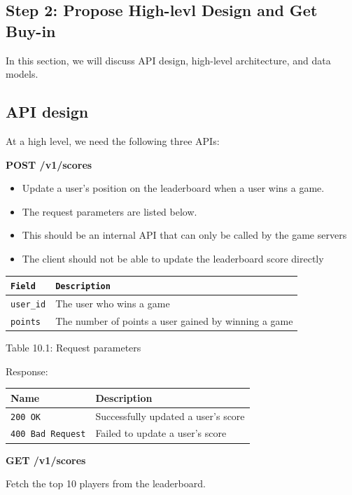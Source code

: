 \documentclass{report}
\theoremstyle{definition}
\let\oldsubsection\subsection
\renewcommand{\subsection}{\oldsubsection*}
\begin{document}
\subsection{Step 2: Propose High-levl Design and Get Buy-in}

In this section, we will discuss API design, high-level architecture, and data models.

\subsection{API design}

At a high level, we need the following three APIs:

\textbf{POST /v1/scores}

\begin{itemize}
\item
Update a user's position on the leaderboard when a user wins a game.
\item
The request parameters are listed below.
\item
This should be an internal API that can only be called by the game servers
\item
The client should not be able  to update the leaderboard score directly
\end{itemize}

\begin{tabular}{|p{6cm}|p{6cm}|}
\hline
\lstinline|Field| & \lstinline|Description| \\
\hline
\lstinline|user_id| & The user who wins a game \\
\hline
\lstinline|points| & The number of points a user gained by winning a game \\
\hline
\end{tabular}

Table 10.1: Request parameters

Response:

\begin{tabular}{|p{6cm}|p{6cm}|}
\hline
\textbf{Name} & \textbf{Description} \\
\hline
\lstinline|200 OK| & Successfully updated a user's score \\
\hline
\lstinline|400 Bad Request| & Failed to update a user's score\\
\hline
\end{tabular}

\textbf{GET /v1/scores}

Fetch the top 10 players from the leaderboard.
\end{document}
